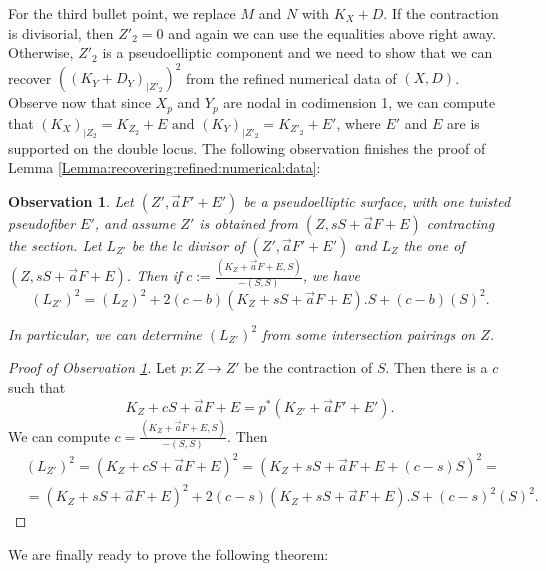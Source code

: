 \documentclass[11pt]{amsart}
\newtheorem{Oss}[theorem]{Observation}
\theoremstyle{definition}
\begin{document}
For the third bullet point, we replace $M$ and $N$ with $K_{X}+ D$. If the contraction is divisorial, then $Z'_2=0$ and again
we can use the equalities above right away. Otherwise, $Z'_2$ is a pseudoelliptic
component and we need to show that we can recover
$((K_{Y}+ D_Y)_{|Z'_2})^2$ from the refined numerical data of $(X,D)$. Observe
now that since $X_p$ and $Y_p$ are nodal in codimension 1, we can compute that
$(K_{X})_{|Z_2}=K_{Z_2}+E \text{ and }(K_{Y})_{|Z'_2}=K_{Z'_2}+E'$,
where $E'$ and $E$ are is supported on the double locus. The following observation finishes the proof of Lemma \ref{Lemma:recovering:refined:numerical:data}:
\begin{Oss}\label{Oss:we:can:recover:selfintersection:lc:on:psudo}
 Let $(Z',\vec{a}F'+E')$ be a pseudoelliptic surface, with one twisted pseudofiber $E'$,
 and assume $Z'$ is obtained from $(Z,sS+\vec{a}F+E)$ contracting the section. Let
 $L_{Z'}$ be the lc divisor of $(Z',\vec{a}F'+E')$ and $L_Z$ the one of $(Z,sS+\vec{a}F+E)$.
 Then if  $c:=\frac{(K_Z+\vec{a}F+E,S)}{-(S,S)}$, we have $$(L_{Z'})^2=(L_Z)^2+2(c-b)(K_{Z}+sS+\vec{a}F+E).S+(c-b)(S)^2.$$
 
 In particular, we can determine $(L_{Z'})^2$ from some intersection pairings on $Z$.
\end{Oss}
\begin{proof}[Proof of Observation \ref{Oss:we:can:recover:selfintersection:lc:on:psudo}]
Let $p:Z \to Z'$ be the contraction of $S$. Then there is a $c$ such that
$$K_{Z}+cS+\vec{a}F+E=p^*(K_{Z'}+\vec{a}F'+E').$$
We can compute $c=\frac{(K_Z+\vec{a}F+E,S)}{-(S,S)}$. Then
\begin{align*}
 &(L_{Z'})^2=(K_{Z}+cS+\vec{a}F+E)^2=(K_{Z}+sS+\vec{a}F+E+(c-s)S)^2=\\
 &=(K_{Z}+sS+\vec{a}F+E)^2+2(c-s)(K_{Z}+sS+\vec{a}F+E).S+(c-s)^2(S)^2.
\end{align*}\end{proof}
We are finally ready to prove the following theorem:
\end{document}
